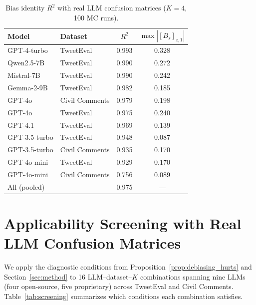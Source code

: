 \begin{table}[h]
\centering
\caption{Bias identity $R^2$ with real LLM confusion matrices ($K{=}4$, 100 MC runs).}
\label{tab:realcm_r2}
\small
\begin{tabular}{llcc}
\toprule
Model & Dataset & $R^2$ & $\max|[B_s]_{z,1}|$ \\
\midrule
GPT-4-turbo  & TweetEval & 0.993 & 0.328 \\
Qwen2.5-7B   & TweetEval & 0.990 & 0.272 \\
Mistral-7B   & TweetEval & 0.990 & 0.242 \\
Gemma-2-9B   & TweetEval & 0.982 & 0.185 \\
GPT-4o       & Civil Comments & 0.979 & 0.198 \\
GPT-4o       & TweetEval & 0.975 & 0.240 \\
GPT-4.1      & TweetEval & 0.969 & 0.139 \\
GPT-3.5-turbo & TweetEval & 0.948 & 0.087 \\
GPT-3.5-turbo & Civil Comments & 0.935 & 0.170 \\
GPT-4o-mini  & TweetEval & 0.929 & 0.170 \\
GPT-4o-mini  & Civil Comments & 0.756 & 0.089 \\
\midrule
\multicolumn{2}{l}{All (pooled)} & 0.975 & --- \\
\bottomrule
\end{tabular}
\end{table}

\section{Applicability Screening with Real LLM Confusion Matrices}
\label{app:screening}

We apply the diagnostic conditions from Proposition~\ref{prop:debiasing_hurts} and Section~\ref{sec:method} to 16 LLM--dataset--$K$ combinations spanning nine LLMs (four open-source, five proprietary) across TweetEval and Civil Comments.
Table~\ref{tab:screening} summarizes which conditions each combination satisfies.

